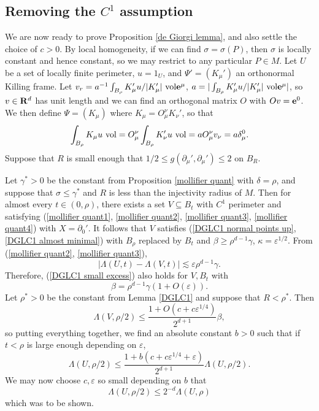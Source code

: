 \subsection{Removing the \texorpdfstring{$C^1$}{C1} assumption}\label{proof of DGL}
We are now ready to prove Proposition \ref{de Giorgi lemma}, and also settle the choice of $c > 0$.
By local homogeneity, if we can find $\sigma = \sigma(P)$, then $\sigma$ is locally constant and hence constant, so we may restrict to any particular $P \in M$.
Let $U$ be a set of locally finite perimeter, $u = 1_U$, and $\Psi' = (K_\mu')$ an orthonormal Killing frame.
Let $v_r = a^{-1}\int_{B_\rho} K_\mu' u/|K_\mu'| ~\mathrm{vol} \mathbf e^\mu$, $a = |\int_{B_\rho} K_\mu' u/|K_\mu'| ~\mathrm{vol} \mathbf e^\mu|$, so $v \in \mathbf{R}^d$ has unit length and we can find an orthogonal matrix $O$ with $Ov = \mathbf e^0$.
We then define $\Psi = (K_\mu)$ where $K_\mu = O^\nu_\mu K_\nu'$, so that
$$\int_{B_\rho} K_\mu u ~\mathrm{vol} = O^\nu_\mu \int_{B_\rho} K_\nu' u ~\mathrm{vol} = aO^\nu_\mu v_\nu = a\delta_\mu^0.$$
Suppose that $R$ is small enough that $1/2 \leq g(\partial_\mu', \partial_\mu') \leq 2$ on $B_R$.

Let $\gamma^* > 0$ be the constant from Proposition \ref{mollifier quant} with $\delta = \rho$, and suppose that $\sigma \leq \gamma^*$ and $R$ is less than the injectivity radius of $M$.
Then for almost every $t \in (0, \rho)$, there exists a set $V \subseteq B_t$ with $C^1$ perimeter and satisfying (\ref{mollifier quant1}, \ref{mollifier quant2}, \ref{mollifier quant3}, \ref{mollifier quant4}) with $X = \partial_0'$.
It follows that $V$ satisfies (\ref{DGLC1 normal points up}, \ref{DGLC1 almost minimal}) with $B_\rho$ replaced by $B_t$ and $\beta \geq \rho^{d - 1} \gamma$, $\kappa = \varepsilon^{1/2}$.
From (\ref{mollifier quant2}, \ref{mollifier quant3}),
$$|\Lambda(U, t) - \Lambda(V, t)| \lesssim \varepsilon \rho^{d - 1} \gamma.$$
Therefore, (\ref{DGLC1 small excess}) also holds for $V, B_t$ with
$$\beta = \rho^{d - 1} \gamma(1 + O(\varepsilon)).$$
Let $\rho^* > 0$ be the constant from Lemma \ref{DGLC1} and suppose that $R < \rho^*$.
Then
$$\Lambda(V, \rho/2) \leq \frac{1 + O(c + c\varepsilon^{1/4})}{2^{d + 1}} \beta,$$
so putting everything together, we find an absolute constant $b > 0$ such that if $t < \rho$ is large enough depending on $\varepsilon$,
$$\Lambda(U, \rho/2) \leq \frac{1 + b(c + c\varepsilon^{1/4} + \varepsilon)}{2^{d + 1}} \Lambda(U, \rho/2).$$
We may now choose $c, \varepsilon$ so small depending on $b$ that
$$\Lambda(U, \rho/2) \leq 2^{-d} \Lambda(U, \rho)$$
which was to be shown.

